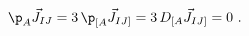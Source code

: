 \begin{equation}
  \p_A \vec{J}_{IJ} = 3\, \p_{[A} \vec{J}_{IJ]} = 3\, D_{[A}
  \vec{J}_{IJ]} = 0\ .
 \end{equation}

